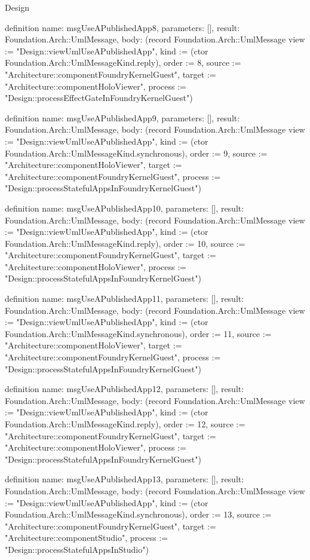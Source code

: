 \begin{lexlean}{Design}
\begin{semanticmodule}
definition{
  name: msgUseAPublishedApp8,
  parameters: [],
  result: Foundation.Arch::UmlMessage,
  body: (record Foundation.Arch::UmlMessage {view := "Design::viewUmlUseAPublishedApp", kind := (ctor Foundation.Arch::UmlMessageKind.reply), order := 8, source := "Architecture::componentFoundryKernelGuest", target := "Architecture::componentHoloViewer", process := "Design::processEffectGateInFoundryKernelGuest"})
}

definition{
  name: msgUseAPublishedApp9,
  parameters: [],
  result: Foundation.Arch::UmlMessage,
  body: (record Foundation.Arch::UmlMessage {view := "Design::viewUmlUseAPublishedApp", kind := (ctor Foundation.Arch::UmlMessageKind.synchronous), order := 9, source := "Architecture::componentHoloViewer", target := "Architecture::componentFoundryKernelGuest", process := "Design::processStatefulAppsInFoundryKernelGuest"})
}

definition{
  name: msgUseAPublishedApp10,
  parameters: [],
  result: Foundation.Arch::UmlMessage,
  body: (record Foundation.Arch::UmlMessage {view := "Design::viewUmlUseAPublishedApp", kind := (ctor Foundation.Arch::UmlMessageKind.reply), order := 10, source := "Architecture::componentFoundryKernelGuest", target := "Architecture::componentHoloViewer", process := "Design::processStatefulAppsInFoundryKernelGuest"})
}

definition{
  name: msgUseAPublishedApp11,
  parameters: [],
  result: Foundation.Arch::UmlMessage,
  body: (record Foundation.Arch::UmlMessage {view := "Design::viewUmlUseAPublishedApp", kind := (ctor Foundation.Arch::UmlMessageKind.synchronous), order := 11, source := "Architecture::componentHoloViewer", target := "Architecture::componentFoundryKernelGuest", process := "Design::processStatefulAppsInFoundryKernelGuest"})
}

definition{
  name: msgUseAPublishedApp12,
  parameters: [],
  result: Foundation.Arch::UmlMessage,
  body: (record Foundation.Arch::UmlMessage {view := "Design::viewUmlUseAPublishedApp", kind := (ctor Foundation.Arch::UmlMessageKind.reply), order := 12, source := "Architecture::componentFoundryKernelGuest", target := "Architecture::componentHoloViewer", process := "Design::processStatefulAppsInFoundryKernelGuest"})
}

definition{
  name: msgUseAPublishedApp13,
  parameters: [],
  result: Foundation.Arch::UmlMessage,
  body: (record Foundation.Arch::UmlMessage {view := "Design::viewUmlUseAPublishedApp", kind := (ctor Foundation.Arch::UmlMessageKind.synchronous), order := 13, source := "Architecture::componentFoundryKernelGuest", target := "Architecture::componentStudio", process := "Design::processStatefulAppsInStudio"})
}


\end{semanticmodule}
\end{lexlean}
